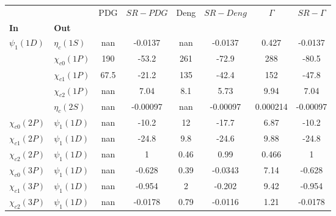 \begin{tabular}{l|l|c|c|c|c|c|c}
\toprule
                &                &  PDG & $SR-PDG$ &  Deng & $SR-Deng$ &  $\Gamma$ & $SR-\Gamma$ \\
\textbf{In} & \textbf{Out} &      &          &       &           &           &             \\
\midrule
\textbf{$\psi_{1}(1D)$} & \textbf{$\eta_{c}(1S)$} &  nan &  -0.0137 &   nan &   -0.0137 &     0.427 &     -0.0137 \\
                & \textbf{$\chi_{c0}(1P)$} &  190 &    -53.2 &   261 &     -72.9 &       288 &       -80.5 \\
                & \textbf{$\chi_{c1}(1P)$} & 67.5 &    -21.2 &   135 &     -42.4 &       152 &       -47.8 \\
                & \textbf{$\chi_{c2}(1P)$} &  nan &     7.04 &   8.1 &      5.73 &      9.94 &        7.04 \\
                & \textbf{$\eta_{c}(2S)$} &  nan & -0.00097 &   nan &  -0.00097 &  0.000214 &    -0.00097 \\
\textbf{$\chi_{c0}(2P)$} & \textbf{$\psi_{1}(1D)$} &  nan &    -10.2 &    12 &     -17.7 &      6.87 &       -10.2 \\
\textbf{$\chi_{c1}(2P)$} & \textbf{$\psi_{1}(1D)$} &  nan &    -24.8 &   9.8 &     -24.6 &      9.88 &       -24.8 \\
\textbf{$\chi_{c2}(2P)$} & \textbf{$\psi_{1}(1D)$} &  nan &        1 &  0.46 &      0.99 &     0.466 &           1 \\
\textbf{$\chi_{c0}(3P)$} & \textbf{$\psi_{1}(1D)$} &  nan &   -0.628 &  0.39 &   -0.0343 &      7.14 &      -0.628 \\
\textbf{$\chi_{c1}(3P)$} & \textbf{$\psi_{1}(1D)$} &  nan &   -0.954 &     2 &    -0.202 &      9.42 &      -0.954 \\
\textbf{$\chi_{c2}(3P)$} & \textbf{$\psi_{1}(1D)$} &  nan &  -0.0178 &  0.79 &   -0.0116 &      1.21 &     -0.0178 \\
\bottomrule
\end{tabular}
